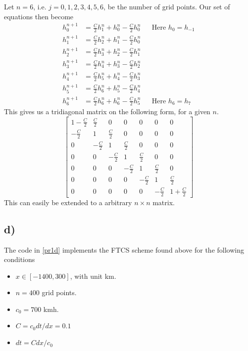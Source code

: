 \documentclass[10pt, a4paper]{amsart}
\begin{document}
Let $n = 6$, i.e. $j = 0,1,2,3,4,5,6$, be the number of grid points. Our set of equations then become 
\begin{align}
	h_0^{n+1} &= \frac{C}{2}h_1^n + h_0^n - \frac{C}{2}h_0^n && \text{Here $h_0 = h_{-1}$}\\
	h_1^{n+1} &= \frac{C}{2}h_2^n + h_1^n - \frac{C}{2}h_0^n\\
	h_2^{n+1} &= \frac{C}{2}h_3^n + h_2^n - \frac{C}{2}h_1^n\\
	h_3^{n+1} &= \frac{C}{2}h_4^n + h_3^n - \frac{C}{2}h_2^n\\
	h_4^{n+1} &= \frac{C}{2}h_5^n + h_4^n - \frac{C}{2}h_3^n\\
	h_5^{n+1} &= \frac{C}{2}h_6^n + h_5^n - \frac{C}{2}h_4^n\\
	h_6^{n+1} &= \frac{C}{2}h_6^n + h_6^n - \frac{C}{2}h_5^n && \text{Here $h_6 = h_7$}
\end{align}
This gives us a tridiagonal matrix on the following form, for a given $n$. 
\begin{equation}
	\begin{bmatrix}
		1-\frac{C}{2} & \frac{C}{2} & 0 & 0 & 0 & 0 & 0\\
		- \frac{C}{2} & 1 & \frac{C}{2} & 0 & 0 & 0 & 0\\
		0 & - \frac{C}{2} & 1 & \frac{C}{2} & 0 & 0 & 0\\
		0 & 0 & - \frac{C}{2} & 1 & \frac{C}{2} & 0 & 0\\
		0 & 0 & 0 & - \frac{C}{2} & 1 & \frac{C}{2} & 0\\
		0 & 0 & 0 & 0 & - \frac{C}{2} & 1 & \frac{C}{2}\\
		0 & 0 & 0 & 0 & 0 & - \frac{C}{2} & 1 + \frac{C}{2}
	\end{bmatrix}
\end{equation}
This can easily be extended to a arbitrary $n \times n$ matrix. 

\subsection{d)}
The code in \ref{pr1d} implements the FTCS scheme found above for the following conditions 
\begin{itemize}
	\item $x \in [-1400, 300]$, with unit km.
	\item $n = 400$ grid points.
	\item $c_0 = 700$ kmh.
	\item $C = c_0 dt/dx = 0.1$
	\item $dt = Cdx/c_0$
\end{itemize}

\end{document}
